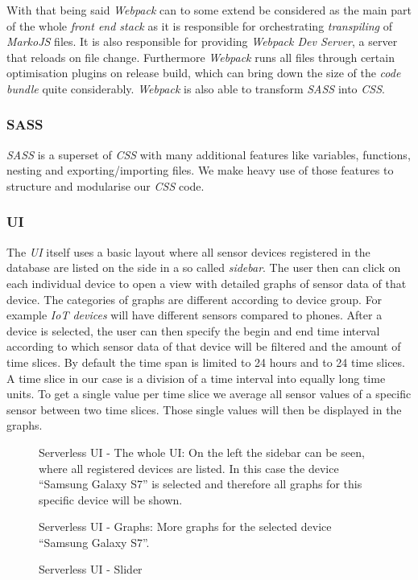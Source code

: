 With that being said \textit{Webpack} can to some extend be considered as the main part of the whole
\textit{front end stack} as it is responsible for orchestrating \textit{transpiling} of
\textit{MarkoJS} files. It is also responsible for providing \textit{Webpack Dev Server}, a server
that reloads on file change. Furthermore \textit{Webpack} runs all files through certain
optimisation plugins on release build, which can bring down the size of the \textit{code bundle}
quite considerably. \textit{Webpack} is also able to transform \textit{SASS} into \textit{CSS}.

\subsubsection{SASS}

\textit{SASS} is a superset of \textit{CSS} with many additional features like variables, functions,
nesting and exporting/importing files. We make heavy use of those features to structure and
modularise our \textit{CSS} code.

\subsubsection{UI}

The \textit{UI} itself uses a basic layout where all sensor devices registered in the database are
listed on the side in a so called \textit{sidebar}. The user then can click on each individual
device to open a view with detailed graphs of sensor data of that device. The categories of graphs
are different according to device group. For example \textit{IoT devices} will have different
sensors compared to phones. After a device is selected, the user can then specify the begin and end
time interval according to which sensor data of that device will be filtered and the amount of time
slices. By default the time span is limited to 24 hours and to 24 time slices. A time slice in our
case is a division of a time interval into equally long time units. To get a single value per time
slice we average all sensor values of a specific sensor between two time slices. Those single values
will then be displayed in the graphs.

\begin{figure}[H]
  \centering
  \caption{Serverless UI - The whole UI: On the left the sidebar can be seen, where all registered devices are listed. In this case the device “Samsung Galaxy S7” is selected and therefore all graphs for this specific device will be shown. }
\end{figure}

\begin{figure}[H]
  \centering
  \caption{Serverless UI - Graphs: More graphs for the selected device “Samsung Galaxy S7”.}
\end{figure}

\begin{figure}[H]
  \centering
  \caption{Serverless UI - Slider}
\end{figure}
